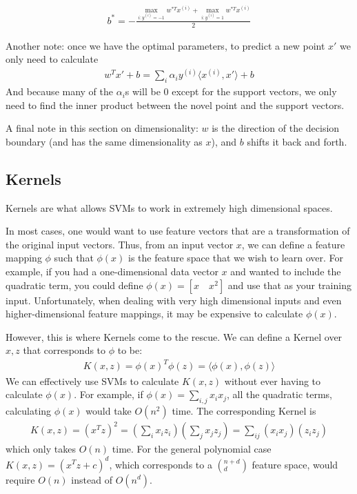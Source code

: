 \documentclass[letterpaper,10pt]{article}
\begin{document}
\begin{align}
b^* = -\frac{\max_{i: y^{(i)}=-1} w^{*T}x^{(i)}+ \max_{i: y^{(i)}=1} w^{*T}x^{(i)}}{2}
\end{align}

Another note: once we have the optimal parameters, to predict a new point $x'$ we only need to calculate 
\begin{align}
w^T x' + b = \sum_i \alpha_i y^{(i)} \langle x^{(i)}, x' \rangle + b
\end{align}
And because many of the $\alpha_i$s will be 0 except for the support vectors, we only need to find the inner product between the novel point and the support vectors.


A final note in this section on dimensionality: $w$ is the direction of the decision boundary (and has the same dimensionality as $x$), and $b$ shifts it back and forth.



\subsection{Kernels}
Kernels are what allows SVMs to work in extremely high dimensional spaces.

In most cases, one would want to use feature vectors that are a transformation of the original input vectors. Thus, from an input vector $x$, we can define a feature mapping $\phi$ such that $\phi(x)$ is the feature space that we wish to learn over. For example, if you had a one-dimensional data vector $x$ and wanted to include the quadratic term, you could define $\phi(x) = [x \quad x^2]$ and use that as your training input. Unfortunately, when dealing with very high dimensional inputs and even higher-dimensional feature mappings, it may be expensive to calculate $\phi(x)$.

However, this is where Kernels come to the rescue. We can define a Kernel over $x,z$ that corresponds to $\phi$ to be:
\begin{align}
K(x,z) = \phi(x)^T \phi(z) = \langle \phi(x), \phi(z) \rangle
\end{align}
We can effectively use SVMs to calculate $K(x,z)$ without ever having to calculate $\phi(x)$. For example, if $\phi(x) = \sum_{i,j} x_i x_j$, all the quadratic terms, calculating $\phi(x)$ would take $O(n^2)$ time. The corresponding Kernel is 
\begin{align}
K(x,z) = (x^Tz)^2 = \left( \sum_i x_i z_i \right) \left( \sum_j x_j z_j \right) = \sum_{ij} (x_i x_j) (z_i z_j)
\end{align}
which only takes $O(n)$ time. For the general polynomial case $K(x,z) = (x^T z + c)^d$, which corresponds to a $(^{n+d}_{d})$ feature space, would require $O(n)$ instead of $O(n^d)$.
\end{document}
